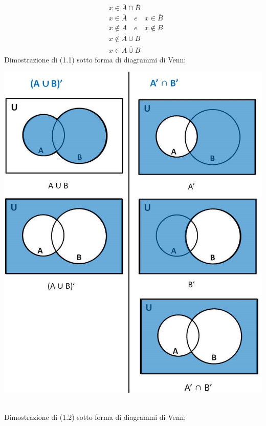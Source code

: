 \begin{align*}
    &x \in \overline{A} \cap \overline{B} \\
    &x \in \overline{A} \quad e \quad x \in \overline{B} \\
    &x \not \in A \quad e \quad x \not \in B \\
    &x \not \in A \cup B \\
    &x \in \overline{A \cup B}
\end{align*}
Dimostrazione di (1.1) sotto forma di diagrammi di Venn:
\begin{center}
    \includegraphics[scale=0.38]{Insiemi/venn-diagram3.jpg}
\end{center}
 \\
Dimostrazione di (1.2) sotto forma di diagrammi di Venn:
